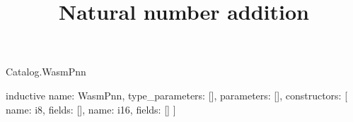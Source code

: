 \begin{lexlean}{Catalog.WasmPnn}
\title{Natural number addition}
\begin{semanticmodule}
inductive{
  name: WasmPnn,
  type_parameters: [],
  parameters: [],
  constructors: [
    {name: i8, fields: []},
    {name: i16, fields: []}
  ]
}
\end{semanticmodule}
\end{lexlean}
